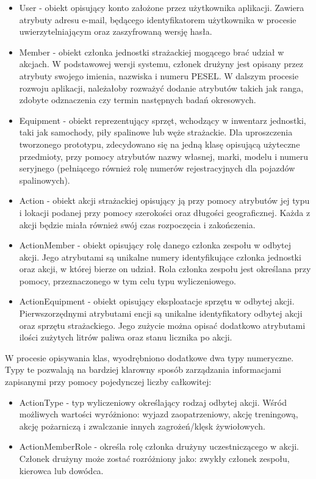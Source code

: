 \begin{itemize}
    \item User - obiekt opisujący konto założone przez użytkownika aplikacji. Zawiera atrybuty adresu e-mail, będącego identyfikatorem użytkownika w procesie uwierzytelniającym oraz zaszyfrowaną wersję hasła.
    \item Member - obiekt członka jednostki strażackiej mogącego brać udział w akcjach. W podstawowej wersji systemu, członek drużyny jest opisany przez atrybuty swojego imienia, nazwiska i numeru PESEL. W dalszym procesie rozwoju aplikacji, należałoby rozważyć dodanie atrybutów takich jak ranga, zdobyte odznaczenia czy termin następnych badań okresowych.
    \item Equipment - obiekt reprezentujący sprzęt, wchodzący w inwentarz jednostki, taki jak samochody, piły spalinowe lub węże strażackie. Dla uproszczenia tworzonego prototypu, zdecydowano się na jedną klasę opisującą użyteczne przedmioty, przy pomocy atrybutów nazwy własnej, marki, modelu i numeru seryjnego (pełniącego również rolę numerów rejestracyjnych dla pojazdów spalinowych). 
    \item Action - obiekt akcji strażackiej opisujący ją przy pomocy atrybutów jej typu i lokacji podanej przy pomocy szerokości oraz długości geograficznej. Każda z akcji będzie miała również swój czas rozpoczęcia i zakończenia.
    \item ActionMember - obiekt opisujący rolę danego członka zespołu w odbytej akcji. Jego atrybutami są unikalne numery identyfikujące członka jednostki oraz akcji, w której bierze on udział. Rola członka zespołu jest określana przy pomocy, przeznaczonego w tym celu typu wyliczeniowego.
    \item ActionEquipment - obiekt opisujący eksploatacje sprzętu  w odbytej akcji. Pierwszorzędnymi atrybutami encji są unikalne identyfikatory odbytej akcji oraz sprzętu strażackiego. Jego zużycie można opisać dodatkowo atrybutami ilości zużytych litrów paliwa oraz stanu licznika po akcji.
\end{itemize}

W procesie opisywania klas, wyodrębniono dodatkowe dwa typy numeryczne. Typy te pozwalają na bardziej klarowny sposób zarządzania informacjami zapisanymi przy pomocy pojedynczej liczby całkowitej:

\begin{itemize}
    \item ActionType - typ wyliczeniowy określający rodzaj odbytej akcji. Wśród możliwych wartości wyróżniono: wyjazd zaopatrzeniowy, akcję treningową, akcję pożarniczą i zwalczanie innych zagrożeń/klęsk żywiołowych.
    \item ActionMemberRole - określa rolę członka drużyny uczestniczącego w akcji. Członek drużyny może zostać rozróżniony jako: zwykły członek zespołu, kierowca lub dowódca.
\end{itemize}

